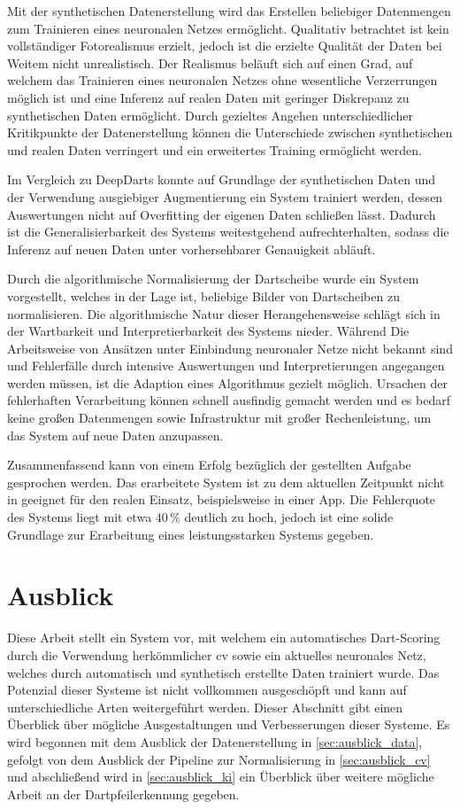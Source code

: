 Mit der synthetischen Datenerstellung wird das Erstellen beliebiger Datenmengen zum Trainieren eines neuronalen Netzes ermöglicht. Qualitativ betrachtet ist kein vollständiger Fotorealismus erzielt, jedoch ist die erzielte Qualität der Daten bei Weitem nicht unrealistisch. Der Realismus beläuft sich auf einen Grad, auf welchem das Trainieren eines neuronalen Netzes ohne wesentliche Verzerrungen möglich ist und eine Inferenz auf realen Daten mit geringer Diskrepanz zu synthetischen Daten ermöglicht. Durch gezieltes Angehen unterschiedlicher Kritikpunkte der Datenerstellung können die Unterschiede zwischen synthetischen und realen Daten verringert und ein erweitertes Training ermöglicht werden.

Im Vergleich zu DeepDarts konnte auf Grundlage der synthetischen Daten und der Verwendung ausgiebiger Augmentierung ein System trainiert werden, dessen Auswertungen nicht auf Overfitting der eigenen Daten schließen lässt. Dadurch ist die Generalisierbarkeit des Systems weitestgehend aufrechterhalten, sodass die Inferenz auf neuen Daten unter vorhersehbarer Genauigkeit abläuft.

Durch die algorithmische Normalisierung der Dartscheibe wurde ein System vorgestellt, welches in der Lage ist, beliebige Bilder von Dartscheiben zu normalisieren. Die algorithmische Natur dieser Herangehensweise schlägt sich in der Wartbarkeit und Interpretierbarkeit des Systems nieder. Während Die Arbeitsweise von Ansätzen unter Einbindung neuronaler Netze nicht bekannt sind und Fehlerfälle durch intensive Auswertungen und Interpretierungen angegangen werden müssen, ist die Adaption eines Algorithmus gezielt möglich. Ursachen der fehlerhaften Verarbeitung können schnell ausfindig gemacht werden und es bedarf keine großen Datenmengen sowie Infrastruktur mit großer Rechenleistung, um das System auf neue Daten anzupassen.

Zusammenfassend kann von einem Erfolg bezüglich der gestellten Aufgabe gesprochen werden. Das erarbeitete System ist zu dem aktuellen Zeitpunkt nicht in geeignet für den realen Einsatz, beispielsweise in einer App. Die Fehlerquote des Systems liegt mit etwa $40\,\%$ deutlich zu hoch, jedoch ist eine solide Grundlage zur Erarbeitung eines leistungsstarken Systems gegeben.

\section{Ausblick}
\label{sec:ausblick}

Diese Arbeit stellt ein System vor, mit welchem ein automatisches Dart-Scoring durch die Verwendung herkömmlicher \ac{cv} sowie ein aktuelles neuronales Netz, welches durch automatisch und synthetisch erstellte Daten trainiert wurde. Das Potenzial dieser Systeme ist nicht vollkommen ausgeschöpft und kann auf unterschiedliche Arten weitergeführt werden. Dieser Abschnitt gibt einen Überblick über mögliche Ausgestaltungen und Verbesserungen dieser Systeme. Es wird begonnen mit dem Ausblick der Datenerstellung in \autoref{sec:ausblick_data}, gefolgt von dem Ausblick der Pipeline zur Normalisierung in \autoref{sec:ausblick_cv} und abschließend wird in \autoref{sec:ausblick_ki} ein Überblick über weitere mögliche Arbeit an der Dartpfeilerkennung gegeben.

